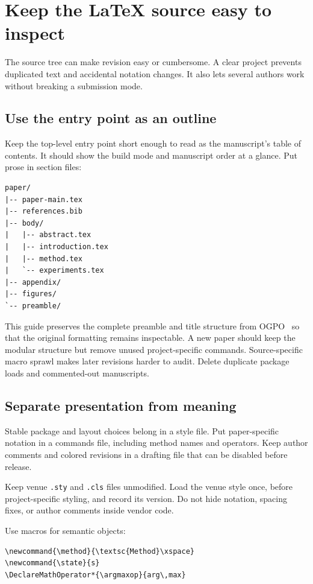 \section{Keep the LaTeX source easy to inspect}
\label{sec:latex}

The source tree can make revision easy or cumbersome. A clear project prevents
duplicated text and accidental notation changes. It also lets several authors
work without breaking a submission mode.

\subsection{Use the entry point as an outline}

Keep the top-level entry point short enough to read as the manuscript's table
of contents. It should show the build mode and manuscript order at a glance.
Put prose in section files:

\begin{verbatim}
paper/
|-- paper-main.tex
|-- references.bib
|-- body/
|   |-- abstract.tex
|   |-- introduction.tex
|   |-- method.tex
|   `-- experiments.tex
|-- appendix/
|-- figures/
`-- preamble/
\end{verbatim}

This guide preserves the complete preamble and title structure from
OGPO~\citep{patil2026ogpo} so that the original formatting remains inspectable.
A new paper should keep the modular structure but remove unused
project-specific commands. Source-specific macro sprawl makes later revisions
harder to audit. Delete duplicate package loads and commented-out manuscripts.

\subsection{Separate presentation from meaning}

Stable package and layout choices belong in a style file. Put paper-specific
notation in a commands file, including method names and operators. Keep author
comments and colored revisions in a drafting file that can be disabled before
release.

Keep venue \texttt{.sty} and \texttt{.cls} files unmodified. Load the venue
style once, before project-specific styling, and record its version. Do not
hide notation, spacing fixes, or author comments inside vendor code.

Use macros for semantic objects:

\begin{verbatim}
\newcommand{\method}{\textsc{Method}\xspace}
\newcommand{\state}{s}
\DeclareMathOperator*{\argmaxop}{arg\,max}
\end{verbatim}

